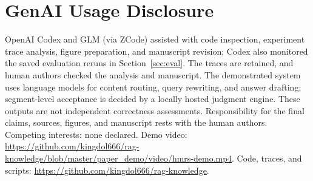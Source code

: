 \section*{GenAI Usage Disclosure}
OpenAI Codex and GLM (via ZCode) assisted with code inspection, experiment
trace analysis, figure preparation, and manuscript revision; Codex also
monitored the saved evaluation reruns in Section~\ref{sec:eval}. The traces
are retained, and human authors checked the analysis and manuscript. The
demonstrated system uses language models for
content routing, query rewriting, and answer drafting; segment-level
acceptance is decided by a locally hosted judgment engine. These outputs
are not independent correctness assessments. Responsibility for the final
claims, sources, figures, and manuscript rests with the human authors.
Competing interests: none declared. Demo video:
\url{https://github.com/kingdol666/rag-knowledge/blob/master/paper_demo/video/hmrs-demo.mp4}.
Code, traces, and scripts:
\url{https://github.com/kingdol666/rag-knowledge}.
